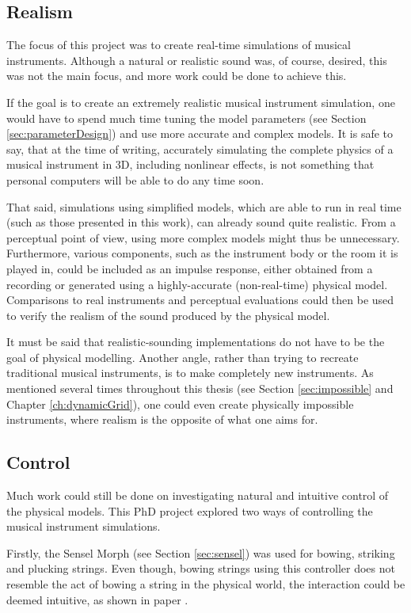 \subsection{Realism}\label{sec:realism}
The focus of this project was to create real-time simulations of musical instruments. Although a natural or realistic sound was, of course, desired, this was not the main focus, and more work could be done to achieve this.

If the goal is to create an extremely realistic musical instrument simulation, one would have to spend much time tuning the model parameters (see Section \ref{sec:parameterDesign}) and use more accurate and complex models. It is safe to say, that at the time of writing, accurately simulating the complete physics of a musical instrument in 3D, including nonlinear effects, is not something that personal computers will be able to do any time soon. 

That said, simulations using simplified models, which are able to run in real time (such as those presented in this work), can already sound quite realistic. From a perceptual point of view, using more complex models might thus be unnecessary. Furthermore, various components, such as the instrument body or the room it is played in, could be included as an impulse response, either obtained from a recording or generated using a highly-accurate (non-real-time) physical model. Comparisons to real instruments and perceptual evaluations could then be used to verify the realism of the sound produced by the physical model.

It must be said that realistic-sounding implementations do not have to be the goal of physical modelling. Another angle, rather than trying to recreate traditional musical instruments, is to make completely new instruments. As mentioned several times throughout this thesis (see Section \ref{sec:impossible} and Chapter \ref{ch:dynamicGrid}), one could even create physically impossible instruments, where realism is the opposite of what one aims for.

\subsection{Control}
Much work could still be done on investigating natural and intuitive control of the physical models. This PhD project explored two ways of controlling the musical instrument simulations. 

Firstly, the Sensel Morph (see Section \ref{sec:sensel}) was used for bowing, striking and plucking strings. Even though, bowing strings using this controller does not resemble the act of bowing a string in the physical world, the interaction could be deemed intuitive, as shown in paper \citeP[A].

